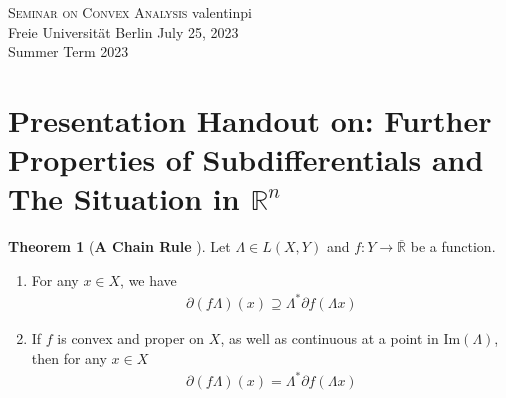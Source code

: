 \documentclass[10pt, leqno]{amsart}
\theoremstyle{definition}
\newtheorem{theorem}{Theorem}[section]
\theoremstyle{remark}
\begin{document}

    \begin{mdframed}
        \textsc{Seminar on Convex Analysis} \hfill valentinpi\\
        Freie Universität Berlin \hfill July 25, 2023\\
        Summer Term 2023
    \end{mdframed}

    \section*{Presentation Handout on: Further Properties of Subdifferentials and The Situation in \(\mathbb{R}^n\)}

    \phantom{}

    \begin{theorem}[{\textbf{A Chain Rule} \cite[p. 201]{IoffeTihomirov}}]
        Let \(\Lambda \in L(X, Y)\) and \(f\colon Y \to \overline{\mathbb{R}}\) be a function.
        \begin{enumerate}[label=(\roman*), wide]
            \item \label{compat_with_operator_theorem_1} For any \(x \in X\), we have
            \begin{align}
                \partial (f\Lambda)(x) \supseteq \Lambda^*\partial f(\Lambda x)
            \end{align}
            \item \label{compat_with_operator_theorem_2} If \(f\) is convex and proper on \(X\), as well as continuous at a point in \(\text{Im}(\Lambda)\), then for any \(x \in X\)
            \begin{align}
                \partial (f\Lambda)(x) = \Lambda^*\partial f(\Lambda x) \label{compat_with_operator_theorem_eq_2}
            \end{align}
        \end{enumerate}
    \end{theorem}

    \begin{figure}[!hbtp]
    \end{figure}
\end{document}
